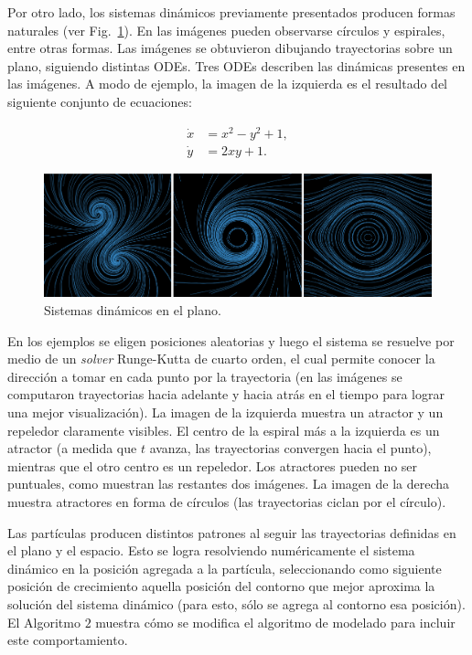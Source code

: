 Por otro lado, los sistemas din\'amicos previamente presentados producen formas naturales (ver Fig.~\ref{fg:sistdin2}). En las im\'agenes pueden observarse c\'irculos y espirales, entre otras formas. Las im\'agenes se obtuvieron dibujando trayectorias sobre un plano, siguiendo distintas ODEs. Tres ODEs describen las din\'amicas presentes en las im\'agenes. A modo de ejemplo, la imagen de la izquierda es el resultado del siguiente conjunto de ecuaciones:

\begin{equation} \label{eq:simple}  
  \begin{aligned}
    \dot{x} &= x^{2}-y^{2}+1,\\
    \dot{y} &= 2xy+1.
  \end{aligned}
\end{equation}


\begin{figure}[htb!]
  \centerline{\includegraphics[width=13cm]{sistdin2}}
  \caption{Sistemas dinámicos en el plano.}
  \label{fg:sistdin2}
\end{figure}

En los ejemplos se eligen posiciones aleatorias y luego el sistema se resuelve por medio de un {\em solver} Runge-Kutta de cuarto orden, el cual permite conocer la direcci\'on a tomar en cada punto por la trayectoria (en las im\'agenes se computaron trayectorias hacia adelante y hacia atrás en el tiempo para lograr una mejor visualizaci\'on). La imagen de la izquierda muestra un atractor y un repeledor claramente visibles. El centro de la espiral m\'as a la izquierda es un atractor (a medida que $t$ avanza, las trayectorias convergen hacia el punto), mientras que el otro centro es un repeledor. Los atractores pueden no ser puntuales, como muestran las restantes dos im\'agenes. La imagen de la derecha muestra atractores en forma de c\'irculos (las trayectorias ciclan por el c\'irculo).

Las part\'iculas producen distintos patrones al seguir las trayectorias definidas en el plano y el espacio. Esto se logra resolviendo num\'ericamente el sistema din\'amico en la posici\'on agregada a la part\'icula, seleccionando como siguiente posici\'on de crecimiento aquella posici\'on del contorno que mejor aproxima la soluci\'on del sistema din\'amico (para esto, sólo se agrega al contorno esa posición). El Algoritmo $2$ muestra cómo se modifica el algoritmo de modelado para incluir este comportamiento.

